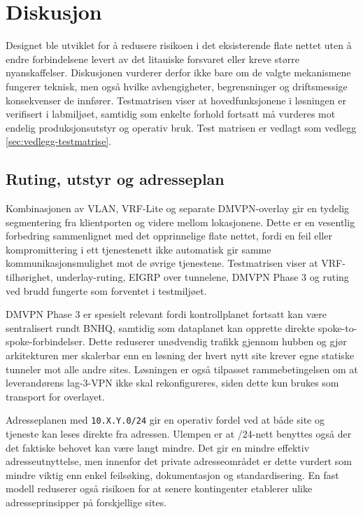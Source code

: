 \section{Diskusjon}

Designet ble utviklet for å redusere risikoen i det eksisterende flate nettet uten å endre forbindelsene levert av det litauiske forsvaret eller kreve større nyanskaffelser. Diskusjonen vurderer derfor ikke bare om de valgte mekanismene fungerer teknisk, men også hvilke avhengigheter, begrensninger og driftsmessige konsekvenser de innfører. Testmatrisen viser at hovedfunksjonene i løsningen er verifisert i labmiljøet, samtidig som enkelte forhold fortsatt må vurderes mot endelig produksjonsutstyr og operativ bruk. Test matrisen er vedlagt som vedlegg \textcolor{red}{\ref{sec:vedlegg-testmatrise}}.

\subsection{Ruting, utstyr og adresseplan}

Kombinasjonen av VLAN, VRF-Lite og separate DMVPN-overlay gir en tydelig segmentering fra klientporten og videre mellom lokasjonene. Dette er en vesentlig forbedring sammenlignet med det opprinnelige flate nettet, fordi en feil eller kompromittering i ett tjenestenett ikke automatisk gir samme kommunikasjonsmulighet mot de øvrige tjenestene. Testmatrisen viser at VRF-tilhørighet, underlay-ruting, EIGRP over tunnelene, DMVPN Phase 3 og ruting ved brudd fungerte som forventet i testmiljøet.

DMVPN Phase 3 er spesielt relevant fordi kontrollplanet fortsatt kan være sentralisert rundt BNHQ, samtidig som dataplanet kan opprette direkte spoke-to-spoke-forbindelser. Dette reduserer unødvendig trafikk gjennom hubben og gjør arkitekturen mer skalerbar enn en løsning der hvert nytt site krever egne statiske tunneler mot alle andre sites. Løsningen er også tilpasset rammebetingelsen om at leverandørens lag-3-VPN ikke skal rekonfigureres, siden dette kun brukes som transport for overlayet.

Adresseplanen med \texttt{10.X.Y.0/24} gir en operativ fordel ved at både site og tjeneste kan leses direkte fra adressen. Ulempen er at /24-nett benyttes også der det faktiske behovet kan være langt mindre. Det gir en mindre effektiv adresseutnyttelse, men innenfor det private adresseområdet er dette vurdert som mindre viktig enn enkel feilsøking, dokumentasjon og standardisering. En fast modell reduserer også risikoen for at senere kontingenter etablerer ulike adresseprinsipper på forskjellige sites.

